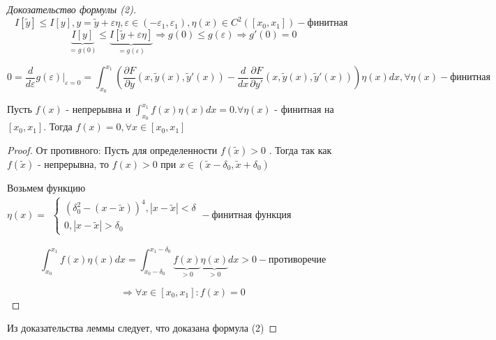 \documentclass[12pt, a4paper]{report}
\begin{document}
\begin{proof}[Докозательство формулы (2)]
    \[ I[\tilde{y}] \le I[y] , y = \tilde{y} + \varepsilon \eta , \varepsilon \in  (- \varepsilon_1, \varepsilon_1), \eta(x) \in C^2([x_0,x_1])  - \text{финитная }    \] 
    \[ \underbrace{I[y]}_{= g(0)} \le \underbrace{I[\tilde{y}+ \varepsilon \eta ]}_{=g(\varepsilon)} \Rightarrow g(0) \le g(\varepsilon) \Rightarrow g'( 0) = 0\] 

    \[ 0= \frac{d}{d \varepsilon} g(\varepsilon) |_{\varepsilon= 0 }= \int_{x_0}^{x_1} \left( \frac{\partial F }{\partial y } ( x , \tilde{y}(x) , \tilde{y }' (x) ) - \frac{d}{dx }  \frac{\partial F }{\partial y' } ( x , \tilde{y}(x) , \tilde{y }' (x) )  \right) \eta (x) dx , \forall \eta (x)  - \text{финитная}    \] 

    \begin{lemma}[Лагранжа]     
        Пусть \( f(x) \) - непрерывна и \( \displaystyle \int_{x_0}^{x_1} f(x) \eta (x) dx =0. \forall \eta (x) \) - финитная на \( [x_0,x_1] \). Тогда \( f(x) = 0 , \forall x \in  [x_0,x_1] \) 
    \end{lemma}

    \begin{proof}
        От противного:
        Пусть для определенности \( f(\tilde{x } )> 0        \) . Тогда так как \( f(\tilde{x}) \) - непрерывна, то \( f(x)>0    \) при \( x \in (\tilde{x}- \delta_0, \tilde{x}+\delta_0) \) 

        Возьмем функцию \( \eta(x) = \begin{aligned}
            \begin{cases}
                (\delta_0 ^2 - (x- \tilde{x})) ^ 4 , |x- \tilde{x}|< \delta   \\
                0 , |x- \tilde{ x } | > \delta_0
                \end{cases}
                - \text{финитная функция} 
        \end{aligned}\)

        \[ \int_{ x_0 }^{x_1} f(x ) \eta(x ) dx = \int_{x_0 - \delta_0}^{x_1- \delta_0} \underbrace{f(x)}_{>0} \underbrace{\eta( x)}_{>0} dx >0 - \text{противоречие}    \] 

        \[ \Rightarrow \forall x \in  [x_0, x_1] : f(x) = 0  \] 
    \end{proof}

    Из доказательства леммы следует, что доказана формула (2)
\end{proof}
\end{document}

